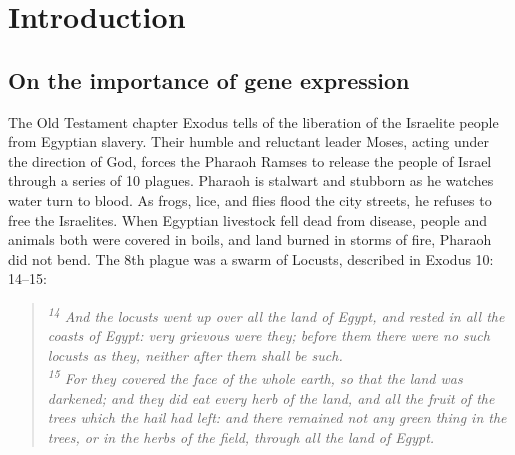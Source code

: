 \chapter{Introduction} %
\label{Chapter1} %

\label{geneNames}
\newcommand\slo{\textit{slo1}}
\newcommand\fn{\textit{Fn1}}
\newcommand\kcnma{\textit{Kcnma}}
\newcommand\dscam{\textit{Dscam1}}

\section{On the importance of gene expression}\label{sec:Importatance of Gene Expression} 

The Old Testament chapter Exodus tells of the liberation of the Israelite people from Egyptian slavery. Their humble and reluctant leader Moses, acting under the direction of God, forces the Pharaoh Ramses to release the people of Israel through a series of 10 plagues. Pharaoh is stalwart and stubborn as he watches water turn to blood. As frogs, lice, and flies flood the city streets, he refuses to free the Israelites. When Egyptian livestock fell dead from disease,   people and animals both were covered in boils, and land burned in storms of fire, Pharaoh did not bend. The 8th plague was a swarm of Locusts, described in Exodus 10: 14–15:

\begin{quote}
	\itshape %
	\singlespacing
	\textsuperscript{14} And the locusts went up over all the land of Egypt, and rested in all the coasts of Egypt: very grievous were they; before them there were no such locusts as they, neither after them shall be such.\\
	\textsuperscript{15} For they covered the face of the whole earth, so that the land was darkened; and they did eat every herb of the land, and all the fruit of the trees which the hail had left: and there remained not any green thing in the trees, or in the herbs of the field, through all the land of Egypt.
\end{quote}

